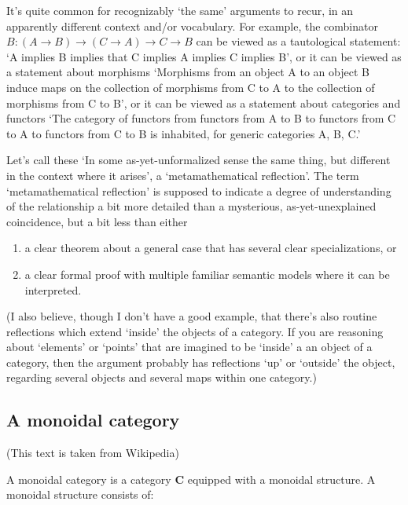 \documentclass[a4paper]{article}
\begin{document}
It's quite common for recognizably `the same' arguments to recur, in an apparently different context and/or vocabulary.
For example, the combinator \(B : (A \to B) \to (C \to A) \to C \to B\) can be viewed as a tautological statement: `A implies B implies that C implies A implies C implies B', or it can be viewed as a statement about morphisms `Morphisms from an object A to an object B induce maps on the collection of morphisms from C to A to the collection of morphisms from C to B', or it can be viewed as a statement about categories and functors `The category of functors from functors from A to B to functors from C to A to functors from C to B is inhabited, for generic categories A, B, C.'

Let's call these `In some as-yet-unformalized sense the same thing, but different in the context where it arises', a `metamathematical reflection'. The term `metamathematical reflection' is supposed to indicate a degree of understanding of the relationship a bit more detailed than a mysterious, as-yet-unexplained coincidence, but a bit less than either
\begin{enumerate}
    \item a clear theorem about a general case that has several clear specializations, or
    \item a clear formal proof with multiple familiar semantic models where it can be interpreted.
\end{enumerate} 

(I also believe, though I don't have a good example, that there's also
routine reflections which extend `inside' the objects of a category. If you are reasoning about `elements' or `points' that are imagined to be `inside' a an object of a category, then the argument probably has reflections `up' or `outside' the object, regarding several objects and several maps within one category.)

\subsection{A monoidal category}

(This text is taken from Wikipedia) 

A monoidal category is a category \(\mathbf{C} \) equipped with a monoidal structure. A monoidal structure consists of:
\end{document}

